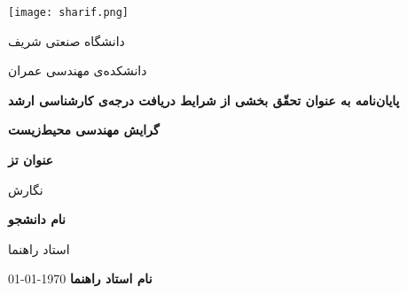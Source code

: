 \begin{titlepage}
\vspace*{1cm}
\begin{center}
\texttt{[image: sharif.png]}

 \large
 دانشگاه صنعتی شریف


دانشکده‌ی مهندسی عمران

\vspace*{1cm}
\large
\textbf{پایان‌نامه به عنوان تحقّق بخشی از شرایط دریافت درجه‌ی کارشناسی ارشد}


\textbf{گرایش مهندسی محیط‌زیست}

\vspace*{1.5cm}
\Huge
\textbf{عنوان تز}     
\vspace{1.5cm}

\Large

نگارش

\textbf{نام دانشجو}
\vspace{1.5cm}

استاد راهنما

\textbf{نام استاد راهنما}
\vfill
\Large
\today        
\end{center}
\end{titlepage}
